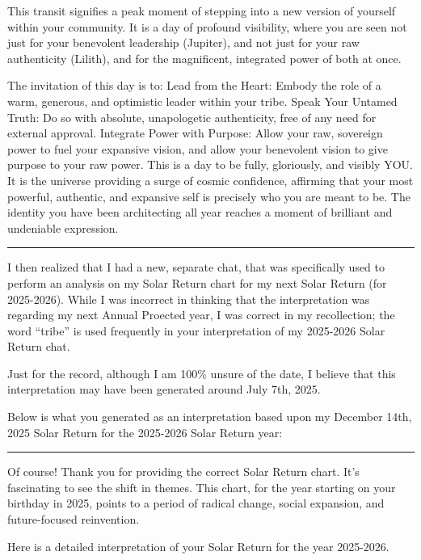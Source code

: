 \documentclass{article}
\begin{document}
This transit signifies a peak moment of stepping into a new version of yourself within your community. It is a day of profound visibility, where you are seen not just for your benevolent leadership (Jupiter), and not just for your raw authenticity (Lilith), and for the magnificent, integrated power of both at once.

The invitation of this day is to: Lead from the Heart: Embody the role of a warm, generous, and optimistic leader within your tribe. Speak Your Untamed Truth: Do so with absolute, unapologetic authenticity, free of any need for external approval. Integrate Power with Purpose: Allow your raw, sovereign power to fuel your expansive vision, and allow your benevolent vision to give purpose to your raw power. This is a day to be fully, gloriously, and visibly YOU. It is the universe providing a surge of cosmic confidence, affirming that your most powerful, authentic, and expansive self is precisely who you are meant to be. The identity you have been architecting all year reaches a moment of brilliant and undeniable expression.

\begin{center}\rule{0.5\linewidth}{0.5pt}\end{center}

I then realized that I had a new, separate chat, that was specifically used to perform an analysis on my Solar Return chart for my next Solar Return (for 2025-2026). While I was incorrect in thinking that the interpretation was regarding my next Annual Proected year, I was correct in my recollection; the word ``tribe'' is used frequently in your interpretation of my 2025-2026 Solar Return chat.

Just for the record, although I am 100\% unsure of the date, I believe that this interpretation may have been generated around July 7th, 2025.

Below is what you generated as an interpretation based upon my December 14th, 2025 Solar Return for the 2025-2026 Solar Return year:

\begin{center}\rule{0.5\linewidth}{0.5pt}\end{center}

Of course! Thank you for providing the correct Solar Return chart. It's fascinating to see the shift in themes. This chart, for the year starting on your birthday in 2025, points to a period of radical change, social expansion, and future-focused reinvention.

Here is a detailed interpretation of your Solar Return for the year 2025-2026.
\end{document}
